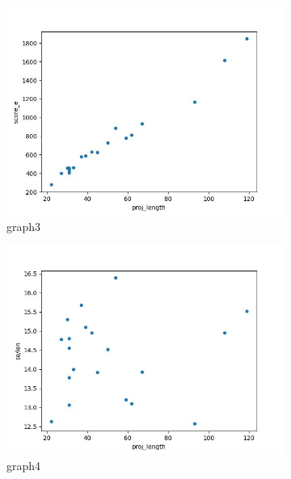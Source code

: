 \documentclass[12pt,a4paper]{article}
\begin{document}
\begin{figure}[H]
\begin{subfigure}[t]{0.5\linewidth}
		\includegraphics[width=1\linewidth]{plots/lenVSse.jpg}
		\caption{graph3}
		\label{sub:graph3}
	\end{subfigure}
	\begin{subfigure}[t]{0.5\linewidth}
		\centering
		\includegraphics[width=1\linewidth]{plots/lenVSselen.jpg}
		\caption{graph4}
		\label{sub:graph4}	
	\end{subfigure}
		\begin{subfigure}[t]{0.5\linewidth}
		\centering

\end{subfigure}
\end{figure}
\end{document}
